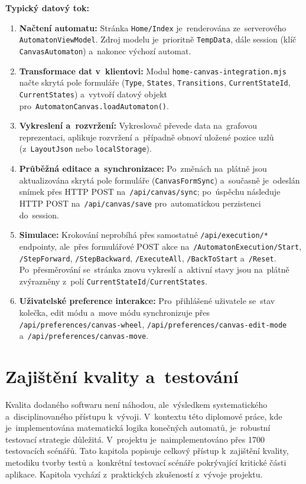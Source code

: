 \documentclass[
  master,
  program=ainfvs,
  printversion,
  figures=false,
  tables=false,
  glossaries,
  index
]{kidiplom}
\begin{document}
\textbf{Typický datový tok:}
\begin{enumerate}
    \item \textbf{Načtení automatu:} Stránka \texttt{Home/Index} je~renderována ze~serverového \texttt{AutomatonViewModel}. Zdroj modelu je~prioritně \texttt{TempData}, dále session (klíč \texttt{CanvasAutomaton}) a~nakonec výchozí automat.
    \item \textbf{Transformace dat v~klientovi:} Modul \texttt{home-\-canvas-\-in\-te\-gra\-ti\-on\-.\-mjs} načte skrytá pole formuláře (\texttt{Type}, \texttt{States}, \texttt{Transitions}, \texttt{Current\-State\-Id}, \texttt{CurrentStates}) a~vytvoří datový objekt pro~\texttt{Au\-to\-ma\-ton\-Can\-vas.load\-Automaton()}.
    \item \textbf{Vykreslení a~rozvržení:} Vykreslovač převede data na~grafovou reprezentaci, aplikuje rozvržení a~případně obnoví uložené pozice uzlů (z~\texttt{Layout\-Js\-on} nebo \texttt{localStorage}).
    \item \textbf{Průběžná editace a~synchronizace:} Po~změnách na~plátně jsou aktualizována skrytá pole formuláře (\texttt{CanvasFormSync}) a~současně je~odeslán snímek přes HTTP POST na~\texttt{/api/canvas/sync}; po~úspěchu následuje HTTP POST na~\texttt{/api/canvas/save} pro~automatickou perzistenci do~session.
    \item \textbf{Simulace:} Krokování neprobíhá přes samostatné \texttt{/api/execution/*} endpointy, ale~přes formulářové POST akce na~\texttt{/AutomatonExecution\-/Start}, \texttt{/StepForward}, \texttt{/StepBackward}, \texttt{/ExecuteAll}, \texttt{/Ba\-ck\-To\-St\-a\-rt} a~\texttt{/Reset}. Po~přesměrování se~stránka znovu vykreslí a~aktivní stavy jsou na~plátně zvýrazněny z~polí \texttt{CurrentStateId}/\texttt{Current\-Sta\-tes}.
    \item \textbf{Uživatelské preference interakce:} Pro~přihlášené uživatele se~stav kolečka, edit módu a~move módu synchronizuje přes \texttt{/api/\-preferences\-/\-canvas-wheel}, \texttt{/api/preferences/canvas-edit-mode} a~\texttt{/api\-/\-preferences/\-canvas-move}.
\end{enumerate}

\newpage
\section{Zajištění kvality a~testování} \label{sec:testovani}
Kvalita dodaného softwaru není náhodou, ale~výsledkem systematického a~disciplinovaného přístupu k~vývoji. V~kontextu této diplomové práce, kde je~implementována matematická logika konečných automatů, je~robustní testovací strategie důležitá. V~projektu je~naimplementováno přes 1700 testovacích scénářů. Tato kapitola popisuje celkový přístup k~zajištění kvality, metodiku tvorby testů a~konkrétní testovací scénáře pokrývající kritické části aplikace. Kapitola vychází z~praktických zkušeností z~vývoje projektu.
\end{document}
